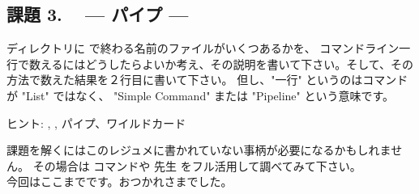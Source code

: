 \documentclass[platex]{jsarticle}
\begin{document}
  \subsection*{課題 3. ~ --- パイプ ---}
   ディレクトリに  で終わる名前のファイルがいくつあるかを、
  コマンドライン一行で数えるにはどうしたらよいか考え、その説明を書いて下さい。そして、その方法で数えた結果を２行目に書いて下さい。
  但し、"一行" というのはコマンドが "List" ではなく、
  "Simple Command" または "Pipeline" という意味です。

  ヒント: , , パイプ、ワイルドカード




 \vspace{1zw}
 
  課題を解くにはこのレジュメに書かれていない事柄が必要になるかもしれません。
 その場合は  コマンドや \Google{}先生 をフル活用して調べてみて下さい。\\
  今回はここまでです。おつかれさまでした。
\end{document}
